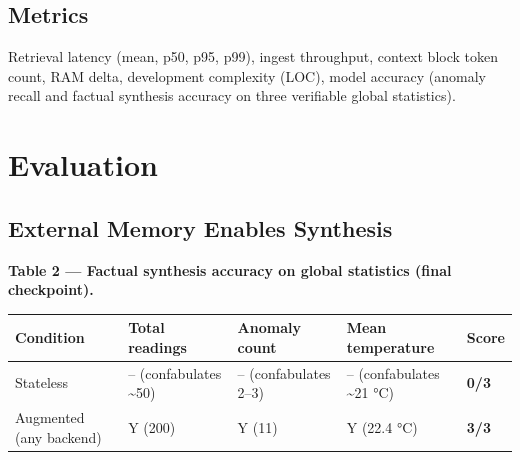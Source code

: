 \subsection{Metrics}\label{metrics}

Retrieval latency (mean, p50, p95, p99), ingest throughput, context block token
count, RAM delta, development complexity (LOC), model accuracy (anomaly recall
and factual synthesis accuracy on three verifiable global statistics).

\section{Evaluation}\label{evaluation}

\subsection{External Memory Enables
Synthesis}\label{external-memory-enables-synthesis}

\textbf{Table 2 --- Factual synthesis accuracy on global statistics (final
checkpoint).}

{\def\LTcaptype{none} %
\begin{longtable}[]{@{}
  >{\raggedright\arraybackslash}p{}
  >{\centering\arraybackslash}p{}
  >{\centering\arraybackslash}p{}
  >{\centering\arraybackslash}p{}
  >{\centering\arraybackslash}p{}@{}}
\toprule\noalign{}
\begin{minipage}[b]{\linewidth}\raggedright
Condition
\end{minipage} & \begin{minipage}[b]{\linewidth}\centering
Total readings
\end{minipage} & \begin{minipage}[b]{\linewidth}\centering
Anomaly count
\end{minipage} & \begin{minipage}[b]{\linewidth}\centering
Mean temperature
\end{minipage} & \begin{minipage}[b]{\linewidth}\centering
Score
\end{minipage} \\
\midrule\noalign{}
\endhead
\bottomrule\noalign{}
\endlastfoot
Stateless & -- (confabulates \textasciitilde50) & -- (confabulates 2--3) & --
(confabulates \textasciitilde21 °C) & \textbf{0/3} \\
Augmented (any backend) & Y (200) & Y (11) & Y (22.4 °C) & \textbf{3/3} \\
\end{longtable}
}


